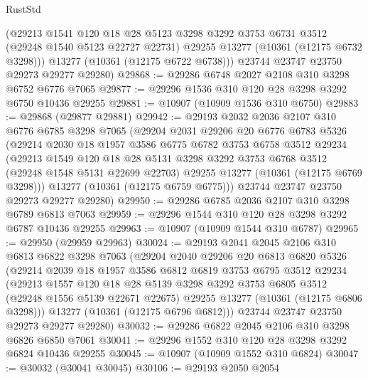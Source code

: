 \begin{lexlean}{RustStd}
\begin{coremodule}
        (@29213
          @1541
          @120
          @18
          @28
          @5123
          @3298
          @3292
          @3753
          @6731
          @3512
          (@29248 @1540 @5123 @22727 @22731)
          @29255
          @13277
          (@10361 (@12175 @6732 @3298)))
        @13277
        (@10361 (@12175 @6722 @6738)))
      @23744
      @23747
      @23750
      @29273
      @29277
      @29280)
@29868 := @29286 @6748 @2027 @2108 @310 @3298 @6752 @6776 @7065
@29877 := @29296 @1536 @310 @120 @28 @3298 @3292 @6750 @10436 @29255
@29881 := @10907 (@10909 @1536 @310 @6750)
@29883 := @29868 (@29877 @29881)
@29942 := @29193
    @2032
    @2036
    @2107
    @310
    @6776
    @6785
    @3298
    @7065
    (@29204
      @2031
      @29206
      @20
      @6776
      @6783
      @5326
      (@29214
        @2030
        @18
        @1957
        @3586
        @6775
        @6782
        @3753
        @6758
        @3512
        @29234
        (@29213
          @1549
          @120
          @18
          @28
          @5131
          @3298
          @3292
          @3753
          @6768
          @3512
          (@29248 @1548 @5131 @22699 @22703)
          @29255
          @13277
          (@10361 (@12175 @6769 @3298)))
        @13277
        (@10361 (@12175 @6759 @6775)))
      @23744
      @23747
      @23750
      @29273
      @29277
      @29280)
@29950 := @29286 @6785 @2036 @2107 @310 @3298 @6789 @6813 @7063
@29959 := @29296 @1544 @310 @120 @28 @3298 @3292 @6787 @10436 @29255
@29963 := @10907 (@10909 @1544 @310 @6787)
@29965 := @29950 (@29959 @29963)
@30024 := @29193
    @2041
    @2045
    @2106
    @310
    @6813
    @6822
    @3298
    @7063
    (@29204
      @2040
      @29206
      @20
      @6813
      @6820
      @5326
      (@29214
        @2039
        @18
        @1957
        @3586
        @6812
        @6819
        @3753
        @6795
        @3512
        @29234
        (@29213
          @1557
          @120
          @18
          @28
          @5139
          @3298
          @3292
          @3753
          @6805
          @3512
          (@29248 @1556 @5139 @22671 @22675)
          @29255
          @13277
          (@10361 (@12175 @6806 @3298)))
        @13277
        (@10361 (@12175 @6796 @6812)))
      @23744
      @23747
      @23750
      @29273
      @29277
      @29280)
@30032 := @29286 @6822 @2045 @2106 @310 @3298 @6826 @6850 @7061
@30041 := @29296 @1552 @310 @120 @28 @3298 @3292 @6824 @10436 @29255
@30045 := @10907 (@10909 @1552 @310 @6824)
@30047 := @30032 (@30041 @30045)
@30106 := @29193
    @2050
    @2054

\end{coremodule}
\end{lexlean}
